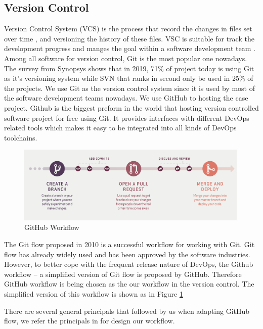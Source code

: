 \subsection{Version Control}
Version Control System (VCS) is the process that record the changes in files set over time \cite{GitAbout93:online}, and versioning the history of these files. VSC is suitable for track the development progress and manges the goal within a software development team \cite{loeliger2012version}. Among all software for version control, Git is the most popular one nowadays. The survey \cite{CompareR31:online} from Synopsys shows that in 2019, 71\% of project today is using Git as it's versioning system while SVN that ranks in second only be used in 25\% of the projects. We use Git as the version control system since it is used by most of the software development teams nowadays. We use GitHub to hosting the case project. Github is the biggest preform in the world that hosting version controlled software project for free using Git. It provides interfaces with different DevOps related tools which makes it easy to be integrated into all kinds of DevOps toolchains.
\begin{figure}[h]
    \centering
    \includegraphics[width=0.99\textwidth]{pics/git.png}
    \caption{GitHub Workflow \cite{guides2013understanding}}
    \label{fig:git}
\end{figure}
\par
The Git flow \cite{driessen2010successful} proposed in 2010 is a successful workflow for working with Git. Git flow has already widely used and has been approved by the software industries. However, to better cope with the frequent release nature of DevOps, the Github workflow -- a simplified version of Git flow is proposed by GitHub.
Therefore GitHub workflow \cite{chacongithub} is being chosen as the our workflow in the version control. The simplified version of this workflow is shown as in Figure \ref{fig:git}
\par
There are several general principals that followed by us when adapting GitHub flow, we refer the principals in \cite{chacongithub} for design our workflow.
